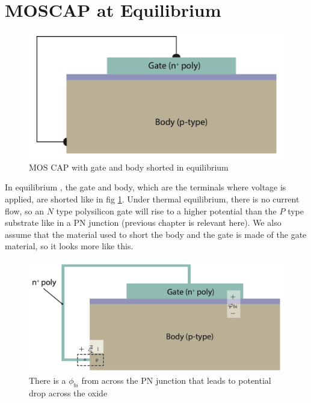 \section{MOSCAP at Equilibrium}
\begin{figure}[H]
    \centering
    \includegraphics[scale=0.4]{figs/ch04/moscap_short.png}
    \caption{MOS CAP with gate and body shorted in equilibrium}
    \label{fig:moscap_short}
\end{figure}
In equilibrium , the gate and body, which are the terminals where voltage is applied, are shorted like in fig \ref{fig:moscap_short}. Under thermal equilibrium, there is no current flow, so an $N$ type polysilicon gate will rise to a higher potential than the $P$ type substrate like in a PN junction (previous chapter is relevant here). We also assume that the material used to short the body and the gate is made of the gate material, so it looks more like this.
\begin{figure}[H]
    \centering
    \includegraphics[scale=0.4]{figs/ch04/moscap_short2.png}
    \caption{There is a $\phi_{bi}$ from across the PN junction that leads to potential drop across the oxide}
\end{figure}

